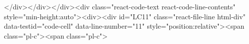 {{{{{{{{{{{{{{{{{{{{{{{{{{{{{{{</div></div></div><div class="react-code-text react-code-line-contents" style="min-height:auto"><div><div id="LC11" class="react-file-line html-div" data-testid="code-cell" data-line-number="11" style="position:relative"><span class="pl-c"><span class="pl-c">%
}}}}}}}}}}}}}}}}}}}}}}}}}}}}}}}
